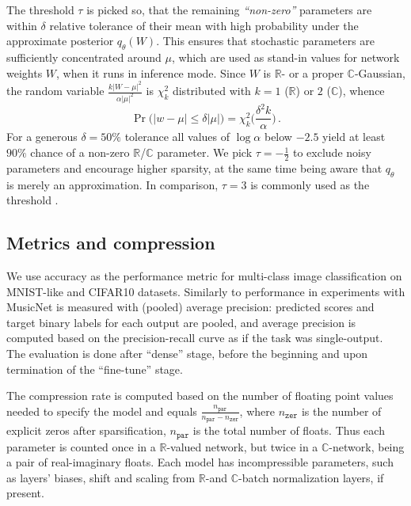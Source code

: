 \documentclass[a4paper,10pt]{article}
\newcommand{\real}{\mathbb{R}}
\newcommand{\cplx}{\mathbb{C}}
\begin{document}
The threshold $\tau$ is picked so, that the remaining \textit{``non-zero''} parameters
are within $\delta$ relative tolerance of their mean with high probability under the
approximate posterior $q_\theta(W)$. This ensures that stochastic parameters are sufficiently
concentrated around $\mu$, which are used as stand-in values for network weights $W$,
when it runs in inference mode. Since $W$ is $\real$- or a proper $\cplx$-Gaussian, the
random variable $
  \tfrac{k \lvert W - \mu \rvert^2}
        {\alpha \lvert \mu \rvert^2}
$ is $\chi^2_k$ distributed with $k=1$ ($\real$) or $2$ ($\cplx$), whence
\begin{equation} \label{eq:prob_relevant}
  \Pr\bigl(
    \lvert w - \mu \rvert \leq \delta \lvert \mu \rvert
  \bigr)
    = \chi^2_k\biggl(\frac{\delta^2 k}{\alpha}\biggr)
  \,.
\end{equation}
For a generous $\delta = 50\%$ tolerance all values of $\log \alpha$ below $-2.5$ yield
at least $90\%$ chance of a non-zero $\real$/$\cplx$ parameter. We pick $\tau = -\tfrac12$
to exclude noisy parameters and encourage higher sparsity, at the same time being aware
that $q_\theta$ is merely an approximation. In comparison, $\tau = 3$ is commonly used as
the threshold \citep{molchanov_variational_2017,kingma_variational_2015}.



\subsection{Metrics and compression} %
\label{sub:metrics_and_compression}

We use accuracy as the performance metric for multi-class image classification on MNIST-like
and CIFAR10 datasets. Similarly to \citet{trabelsi_deep_2017} performance in experiments with
MusicNet is measured with (pooled) average precision: predicted scores and target binary labels
for each output are pooled, and average precision is computed based on the precision-recall
curve as if the task was single-output. The evaluation is done after ``dense'' stage, before
the beginning and upon termination of the ``fine-tune'' stage.

The compression rate is computed based on the number of floating point values needed to
specify the model and equals $
  \tfrac{n_\mathtt{par}}{n_\mathtt{par} - n_\mathtt{zer}}
$, where $n_\mathtt{zer}$ is the number of explicit zeros after sparsification, $n_\mathtt{par}$
is the total number of floats. Thus each parameter is counted once in a $\real$-valued
network, but twice in a $\cplx$-network, being a pair of real-imaginary floats. Each model
has incompressible parameters, such as layers' biases, shift and scaling from $\real$-and
$\cplx$-batch normalization layers, if present.
\end{document}
